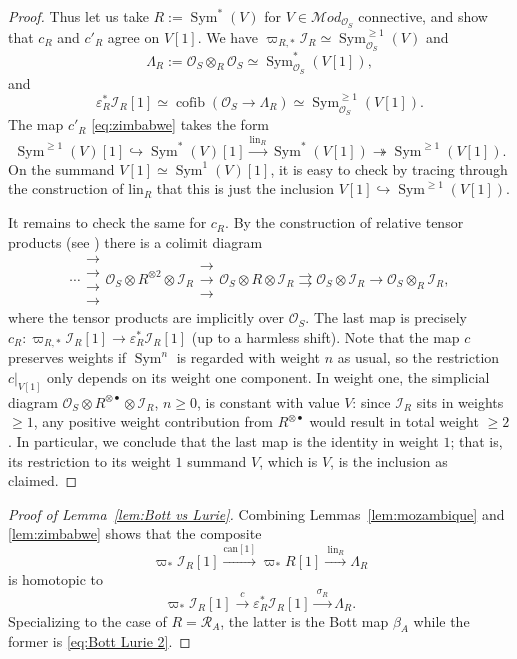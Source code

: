 \documentclass[12pt, oneside]{amsart}
\numberwithin{equation}{section}
\theoremstyle{remark}
\theoremstyle{plain}
\renewcommand{\ge}{\geqslant}
\newcommand{\MOD}{\mathcal{M}\textit{od}}
\newcommand{\R}{\mathcal{R}}
\newcommand{\RA}{\R_A}
\newcommand{\lam}{\Lambda}
\newcommand{\OO}{\mathcal{O}}
\newcommand{\rightrightrightarrows}
  {\mathrel{\substack{\textstyle\rightarrow\\[-0.6ex]
   \textstyle\rightarrow \\[-0.6ex]
   \textstyle\rightarrow}}}
\newcommand{\rightrightrightrightarrows}
  {\mathrel{\substack{\textstyle\rightarrow\\[-0.6ex]
   \textstyle\rightarrow \\[-0.6ex]
   \textstyle\rightarrow \\[-0.6ex]
   \textstyle\rightarrow}}}
\DeclareMathOperator{\Sym}{Sym}
\newcommand{\eps}{\varepsilon}
\begin{document}
\begin{proof}
Thus let us take $R := \Sym^*(V)$ for $V \in \MOD_{\OO_S}$ connective, and show that $c_R$ and $c'_R$ agree on $V[1]$.
We have $\varpi_{R,*} \mathcal{I}_R \simeq \Sym^{\ge 1}_{\OO_S}(V)$ and
\[
  \lam_{R} := \OO_S \otimes_{R} \OO_S \simeq \Sym_{\OO_S}^*(V[1]),
\]
and
\[
  \eps_{R}^* \mathcal{I}_R [1]
  \simeq \operatorname{cofib}(\OO_S \to \lam_R)
  \simeq \Sym_{\OO_S}^{\ge 1}(V[1]).
\]
The map $c'_R$ \eqref{eq:zimbabwe} takes the form
\[
  \Sym^{\ge 1}(V)[1]
  \hookrightarrow \Sym^*(V)[1]
  \xrightarrow{\mathrm{lin}_R} \Sym^*(V[1])
  \twoheadrightarrow \Sym^{\ge 1}(V[1]).
\]
On the summand $V[1] \simeq \Sym^1(V)[1]$, it is easy to check by tracing through the construction of $\mathrm{lin}_R$ that this is just the inclusion $V[1] \hookrightarrow \Sym^{\ge 1}(V[1])$.

It remains to check the same for $c_R$.
By the construction of relative tensor products  (see \cite[Constr.~4.4.2.7]{LurieHA}) there is a colimit diagram
\[
  \cdots
  \rightrightrightrightarrows \OO_S \otimes R^{\otimes 2} \otimes \mathcal{I}_R
  \rightrightrightarrows \OO_S \otimes R \otimes \mathcal{I}_R
  \rightrightarrows \OO_S \otimes \mathcal{I}_R
  \rightarrow \OO_S \otimes_R \mathcal{I}_R,
\]
where the tensor products are implicitly over $\OO_S$.
The last map is precisely $c_R : \varpi_{R,*}\mathcal{I}_R[1] \to \eps_R^*\mathcal{I}_R[1]$ (up to a harmless shift).
Note that the map $c$ preserves weights if $\Sym^n$ is regarded with weight $n$ as usual, so the restriction $c|_{V[1]}$ only depends on its weight one component.
In weight one, the simplicial diagram $\OO_S \otimes R^{\otimes \bullet} \otimes \mathcal{I}_R$, $n \ge 0$, is constant with value $V$: since $\mathcal{I}_R$ sits in weights $\ge 1$, any positive weight contribution from $R^{\otimes \bullet}$ would result in total weight $\ge 2$.
In particular, we conclude that the last map is the identity in weight $1$; that is, its restriction to its weight $1$ summand $V$, which is $V$, is the inclusion as claimed.
\end{proof}

\begin{proof}[Proof of Lemma~\ref{lem:Bott vs Lurie}]
  Combining Lemmas~\ref{lem:mozambique} and \ref{lem:zimbabwe} shows that the composite
  \[
    \varpi_* \mathcal{I}_R [1] \xrightarrow{\text{can}[1]} \varpi_* R [1] \xrightarrow{\ \mathrm{lin}_R\ } \lam_R
  \]
  is homotopic to
  \[
    \varpi_* \mathcal{I}_R [1] \xrightarrow{c} \eps_R^* \mathcal{I}_R [1] \xrightarrow{\ \sigma_R\ } \lam_R.
  \]
  Specializing to the case of $R = \RA$, the latter is the Bott map $\beta_A$ while the former is \eqref{eq:Bott Lurie 2}.
\end{proof}
\end{document}
